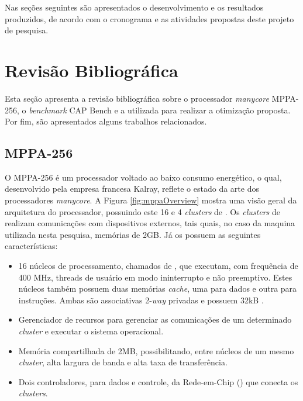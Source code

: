 \documentclass[a4paper,11pt]{article}
\newcommand{\mppa}{MPPA-256\xspace}
\newcommand{\capb}{CAP Bench\xspace}
\newcommand{\manycore}{\textit{manycore}\xspace}
\begin{document}
Nas seções seguintes são apresentados o desenvolvimento e os resultados produzidos, de acordo com o cronograma e as atividades propostas deste projeto de pesquisa.

\section{Revisão Bibliográfica}

Esta seção apresenta a revisão bibliográfica sobre o processador \manycore \mppa, o \textit{benchmark} \capb e a \api utilizada para realizar a otimização proposta. Por fim, são apresentados alguns trabalhos relacionados.

\subsection{MPPA-256}
\label{subsec:mppa}

O \mppa é um processador voltado ao baixo consumo energético, o qual, desenvolvido pela empresa francesa Kalray, reflete o estado da arte dos processadores \manycore. A Figura \ref{fig:mppaOverview} mostra uma visão geral da arquitetura do processador, possuindo este 16 \ccs e 4 \textit{clusters} de \io. 	Os \textit{clusters} de \io realizam comunicações com dispositivos externos, tais quais, no caso da maquina utilizada nesta pesquisa, memórias \lpddr de 2GB. Já os \ccs possuem as seguintes características:
\begin{itemize}
	\item 16 núcleos de processamento, chamados de \pes, que executam, com frequência de 400 MHz, threads de usuário em modo ininterrupto e não preemptivo. Estes núcleos também possuem duas memórias \textit{cache}, uma para dados e outra para instruções. Ambas são associativas 2-\textit{way} privadas	e possuem 32kB \cite{Podesta2018}.
	\item Gerenciador de recursos para gerenciar as comunicações de um determinado \textit{cluster} e executar o sistema operacional.
	\item Memória compartilhada de 2MB, possibilitando, entre núcleos de um mesmo \textit{cluster}, alta largura de banda e alta taxa de transferência.
	\item Dois controladores, para dados e controle, da Rede-em-Chip (\noc) que conecta os \textit{clusters}.
\end{itemize}
\end{document}
